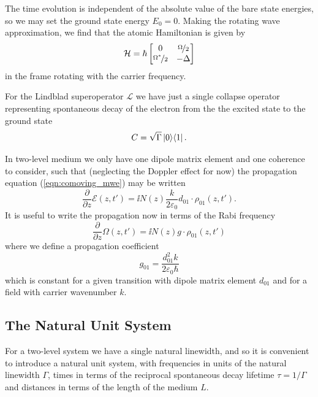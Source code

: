     The time evolution is independent of the absolute value of the bare state
    energies, so we may set the ground state energy $E_0 = 0$. Making the
    rotating wave approximation, we find that the atomic Hamiltonian is given by
    \begin{equation}
      \mathcal{H} = \hbar
      \begin{bmatrix}
        0 & \nicefrac{\Omega}{2} \\
        \nicefrac{\Omega^*}{2} & -\Delta
      \end{bmatrix}
    \end{equation}
    in the frame rotating with the carrier frequency.\cite{allen1975optical}

    For the Lindblad superoperator $\mathcal{L}$ we have just a single collapse
    operator representing spontaneous decay of the electron from the the excited
    state to the ground state
    \begin{equation}
      C = \sqrt{\Gamma}\Ket{0}\!\Bra{1}.
    \end{equation}

    In two-level medium we only have one dipole matrix element and one coherence
    to consider, such that (neglecting the Doppler effect for now) the
    propagation equation (\ref{eqn:comoving_mwe}) may be written
    \begin{equation}
      \frac{\partial}{\partial z}\mathcal{E}(z,t') = 
          \ii N(z) \frac{k}{2 \varepsilon_0} d_{01} \cdot \rho_{01}(z,t').
    \end{equation}
    It is useful to write the propagation now in terms of the Rabi frequency
    \begin{equation}
      \frac{\partial}{\partial z}\Omega(z,t') = \ii N(z) g \cdot \rho_{01}(z,t')
    \end{equation}
    where we define a propagation coefficient
    \begin{equation}
      g_{01} = \frac{d_{01}^2 k}{2 \varepsilon_0 \hbar}
    \end{equation}
    which is constant for a given transition with dipole matrix element $d_{01}$
    and for a field with carrier wavenumber $k$.

  \subsection{The Natural Unit System}

    For a two-level system we have a single natural linewidth, and so it is
    convenient to introduce a natural unit system, with frequencies in units of
    the natural linewidth $\Gamma$, times in terms of the reciprocal spontaneous
    decay lifetime $\tau = 1/\Gamma$ and distances in terms of the length of the
    medium $L$.

